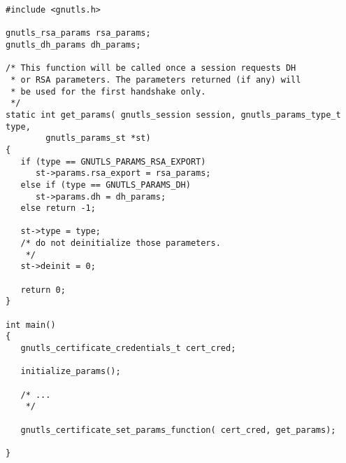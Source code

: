 \begin{verbatim}
#include <gnutls.h>

gnutls_rsa_params rsa_params;
gnutls_dh_params dh_params;

/* This function will be called once a session requests DH
 * or RSA parameters. The parameters returned (if any) will
 * be used for the first handshake only.
 */
static int get_params( gnutls_session session, gnutls_params_type_t type,
        gnutls_params_st *st)
{
   if (type == GNUTLS_PARAMS_RSA_EXPORT)
      st->params.rsa_export = rsa_params;
   else if (type == GNUTLS_PARAMS_DH)
      st->params.dh = dh_params;
   else return -1;

   st->type = type;
   /* do not deinitialize those parameters.
    */
   st->deinit = 0;

   return 0;
}

int main()
{
   gnutls_certificate_credentials_t cert_cred;

   initialize_params();

   /* ...
    */

   gnutls_certificate_set_params_function( cert_cred, get_params);

}
\end{verbatim}
